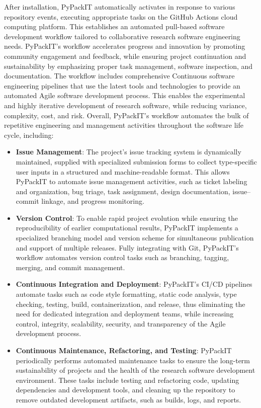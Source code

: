 \documentclass{article}
\begin{document}
After installation, PyPackIT automatically activates in response to various repository events, executing appropriate tasks on the GitHub Actions cloud computing platform. This establishes an automated pull-based software development workflow tailored to collaborative research software engineering needs. PyPackIT's workflow accelerates progress and innovation by promoting community engagement and feedback, while ensuring project continuation and sustainability by emphasizing proper task management, software inspection, and documentation. The workflow includes comprehensive Continuous software engineering pipelines that use the latest tools and technologies to provide an automated Agile software development process. This enables the experimental and highly iterative development of research software, while reducing variance, complexity, cost, and risk. Overall, PyPackIT's workflow automates the bulk of repetitive engineering and management activities throughout the software life cycle, including:

\begin{itemize}
    \item \textbf{Issue Management}:  The project's issue tracking system is dynamically maintained, supplied with specialized submission forms to collect type-specific user inputs in a structured and machine-readable format. This allows PyPackIT to automate issue management activities, such as ticket labeling and organization, bug triage, task assignment, design documentation, issue–commit linkage, and progress monitoring.
    \item \textbf{Version Control}: To enable rapid project evolution while ensuring the reproducibility of earlier computational results, PyPackIT implements a specialized branching model and version scheme for simultaneous publication and support of multiple releases. Fully integrating with Git, PyPackIT's workflow automates version control tasks such as branching, tagging, merging, and commit management.
    \item \textbf{Continuous Integration and Deployment}: PyPackIT's CI/CD pipelines automate tasks such as code style formatting, static code analysis, type checking, testing, build, containerization, and release, thus eliminating the need for dedicated integration and deployment teams, while increasing control, integrity, scalability, security, and transparency of the Agile development process.
    \item \textbf{Continuous Maintenance, Refactoring, and Testing}: PyPackIT periodically performs automated maintenance tasks to ensure the long-term sustainability of projects and the health of the research software development environment. These tasks include testing and refactoring code, updating dependencies and development tools, and cleaning up the repository to remove outdated development artifacts, such as builds, logs, and reports.

\end{itemize}
\end{document}
